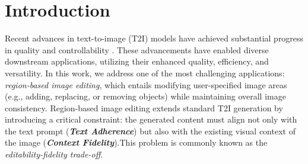 \documentclass{article}
\begin{document}
%
\section{Introduction}
\label{Sec:intro}
%

Recent advances in text-to-image (T2I) models have achieved substantial progress in quality and controllability \citep{rombach2022high,betker2023improving,chen2023pixart,esser2024scaling,blackforest2024FLUX}. These advancements have enabled diverse downstream applications, utilizing their enhanced quality, efficiency, and versatility. In this work, we address one of the most challenging applications: \emph{region-based image editing}, which entails modifying user-specified image areas (e.g., adding, replacing, or removing objects) while maintaining {overall image consistency}.
Region-based image editing extends standard T2I generation by introducing a critical constraint: the generated content must align not only with the text prompt {(\textbf{\textit{Text Adherence}})} but also with the existing visual context of the image {(\textbf{\textit{Context Fidelity}})}.{This problem is commonly known as the \textit{editability-fidelity trade-off}}.
\end{document}
